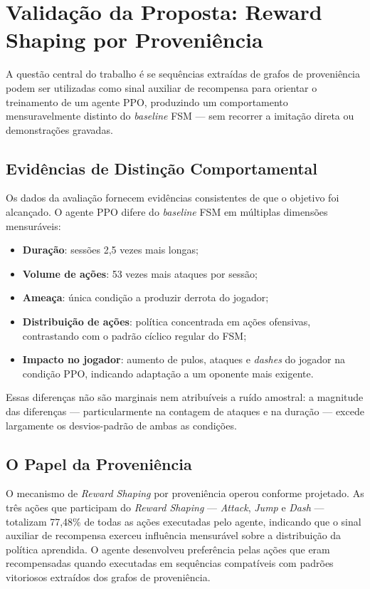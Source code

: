 \section{Validação da Proposta: Reward Shaping por Proveniência}
\label{sec:validacao-proposta}

A questão central do trabalho é se sequências extraídas de grafos de
proveniência podem ser utilizadas como sinal auxiliar de recompensa para
orientar o treinamento de um agente PPO, produzindo um comportamento
mensuravelmente distinto do \textit{baseline} FSM --- sem recorrer a
imitação direta ou demonstrações gravadas.

\subsection{Evidências de Distinção Comportamental}
\label{subsec:evidencias-distincao}

Os dados da avaliação fornecem evidências consistentes de que o objetivo foi
alcançado. O agente PPO difere do \textit{baseline} FSM em múltiplas
dimensões mensuráveis:

\begin{itemize}
    \item \textbf{Duração}: sessões 2,5 vezes mais longas;
    \item \textbf{Volume de ações}: 53 vezes mais ataques por sessão;
    \item \textbf{Ameaça}: única condição a produzir derrota do jogador;
    \item \textbf{Distribuição de ações}: política concentrada em ações
          ofensivas, contrastando com o padrão cíclico regular do FSM;
    \item \textbf{Impacto no jogador}: aumento de pulos, ataques e
          \textit{dashes} do jogador na condição PPO, indicando adaptação a
          um oponente mais exigente.
\end{itemize}

Essas diferenças não são marginais nem atribuíveis a ruído amostral: a
magnitude das diferenças --- particularmente na contagem de ataques e na
duração --- excede largamente os desvios-padrão de ambas as condições.

\subsection{O Papel da Proveniência}
\label{subsec:papel-proveniencia}

O mecanismo de \textit{Reward Shaping} por proveniência operou conforme
projetado. As três ações que participam do \textit{Reward Shaping} ---
\textit{Attack}, \textit{Jump} e \textit{Dash} --- totalizam 77,48\% de
todas as ações executadas pelo agente, indicando que o sinal auxiliar de
recompensa exerceu influência mensurável sobre a distribuição da política
aprendida. O agente desenvolveu preferência pelas ações que eram
recompensadas quando executadas em sequências compatíveis com padrões
vitoriosos extraídos dos grafos de proveniência.

